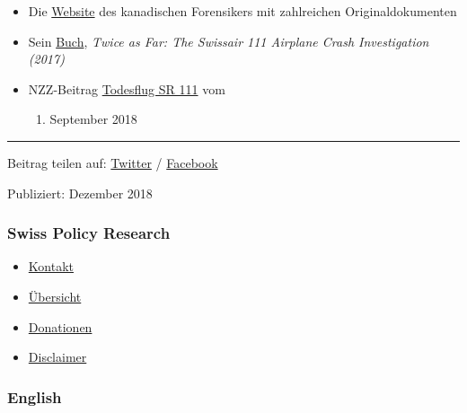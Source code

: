 \begin{itemize}
\tightlist
\item
  Die \href{http://www.swissair111.ca/}{Website} des kanadischen
  Forensikers mit zahlreichen Originaldokumenten
\item
  Sein
  \href{https://www.amazon.com/Twice-Far-SwissAir-Airplane-Investigation/dp/1540879593/}{Buch},
  \emph{Twice as Far: The Swissair 111 Airplane Crash Investigation
  (2017)}
\item
  NZZ-Beitrag
  \href{https://www.nzz.ch/schweiz/todesflug-sr-111-ld.1416442}{Todesflug
  SR 111} vom

  \begin{enumerate}
  \def\labelenumi{\arabic{enumi}.}
  \tightlist
  \item
    September 2018
  \end{enumerate}
\end{itemize}

\begin{center}\rule{0.5\linewidth}{\linethickness}\end{center}

Beitrag teilen auf:
\href{https://twitter.com/intent/tweet?url=https\%3A\%2F\%2Fswprs.org/der-absturz-swissair-111/}{Twitter}
/
\href{https://www.facebook.com/share.php?u=https://swprs.org/der-absturz-swissair-111/}{Facebook}

Publiziert: Dezember 2018

\hypertarget{swiss-policy-research}{%
\subsubsection{Swiss Policy Research}\label{swiss-policy-research}}

\begin{itemize}
\tightlist
\item
  \href{https://swprs.org/kontakt/}{Kontakt}
\item
  \href{https://swprs.org/uebersicht/}{Übersicht}
\item
  \href{https://swprs.org/donationen/}{Donationen}
\item
  \href{https://swprs.org/disclaimer/}{Disclaimer}
\end{itemize}

\hypertarget{english}{%
\subsubsection{English}\label{english}}


